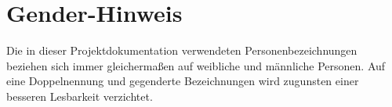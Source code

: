 \thispagestyle{empty}
\chapter*{Gender-Hinweis}
Die in dieser Projektdokumentation verwendeten Personenbezeichnungen beziehen sich immer gleichermaßen auf weibliche und männliche Personen. Auf eine Doppelnennung und gegenderte Bezeichnungen wird zugunsten einer besseren Lesbarkeit verzichtet.